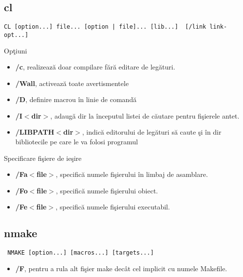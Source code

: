 \documentclass{refcard.cs.pub.ro}
\begin{document}
\begin{multicols*}{3}
\subsection{cl}
\begin{verbatim}CL [option...] file... [option | file]... [lib...]  [/link link-opt...]\end{verbatim}
Opţiuni
\begin{itemize}
\item \textbf{/c}, realizează doar compilare fără editare de legături.
\item \textbf{/Wall}, activează toate avertismentele
\item \textbf{/D}, definire macrou în linie de comandă
\item \textbf{/I$<$dir$>$}, adaugă dir la începutul listei de căutare pentru fişierele antet.
\item \textbf{/LIBPATH$<$dir$>$}, indică editorului de legături să caute şi în dir bibliotecile pe care le va folosi programul
\end{itemize}
Specificare fişiere de ieşire
\begin{itemize}

\item \textbf{/Fa$<$file$>$}, specifică numele fişierului în limbaj de asamblare.
\item \textbf{/Fo$<$file$>$}, specifică numele fişierului obiect.
\item \textbf{/Fe$<$file$>$}, specifică numele fişierului executabil.
\end{itemize}

\subsection{nmake}
\begin{verbatim} NMAKE [option...] [macros...] [targets...] \end{verbatim}
\begin{itemize}
\item \textbf{/F}, pentru a rula alt fişier make decât cel implicit cu numele Makefile. 
\end{itemize}

\end{multicols*}
\end{document}

